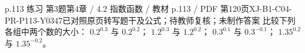 \par\noindent\begin{minipage}{\linewidth}
\begin{bankitem}{p.113 练习 第3题}{第4章 / 4.2 指数函数 / 教材 p.113 / PDF 第120页}{XJ-B1-C04-PR-P113-Y0347}{已对照原页转写题干及公式；待教师复核；未制作答案}
比较下列各组中两个数的大小：
$0.2^{0.3}$ 与 $0.2^{0.2}$；
$1.2^{0.3}$ 与 $1.2^{0.2}$；
$0.3^{0.1}$ 与 $0.3^{-0.1}$；
$1.35^{0.2}$ 与 $1.35^{-0.2}$。
\end{bankitem}
\end{minipage}\par\medskip
